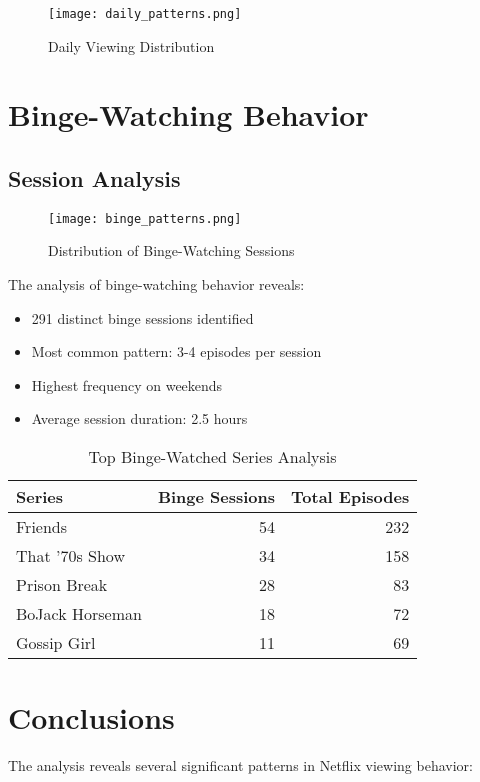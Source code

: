\documentclass[12pt]{article}
\begin{document}
\begin{figure}[H]
\centering
\texttt{[image: daily\_patterns.png]}
\caption{Daily Viewing Distribution}
\label{fig:daily_patterns}
\end{figure}

\section{Binge-Watching Behavior}
\subsection{Session Analysis}
\begin{figure}[H]
\centering
\texttt{[image: binge\_patterns.png]}
\caption{Distribution of Binge-Watching Sessions}
\label{fig:binge_patterns}
\end{figure}

The analysis of binge-watching behavior reveals:
\begin{itemize}
    \item 291 distinct binge sessions identified
    \item Most common pattern: 3-4 episodes per session
    \item Highest frequency on weekends
    \item Average session duration: 2.5 hours
\end{itemize}

\begin{table}[H]
\centering
\caption{Top Binge-Watched Series Analysis}
\label{tab:binge_series}
\begin{tabular}{lrr}
\toprule
Series & Binge Sessions & Total Episodes \\
\midrule
Friends & 54 & 232 \\
That '70s Show & 34 & 158 \\
Prison Break & 28 & 83 \\
BoJack Horseman & 18 & 72 \\
Gossip Girl & 11 & 69 \\
\bottomrule
\end{tabular}
\end{table}

\section{Conclusions}
The analysis reveals several significant patterns in Netflix viewing behavior:
\end{document}
